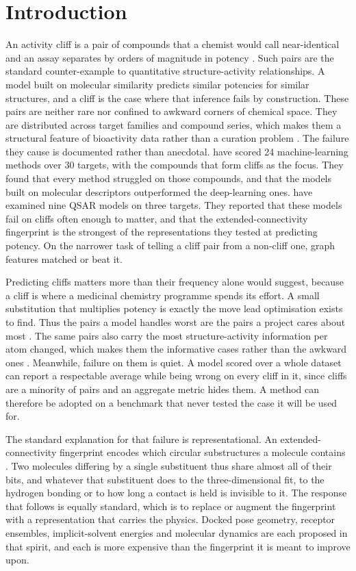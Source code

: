 \section{Introduction}

An activity cliff is a pair of compounds that a chemist would call near-identical and
an assay separates by orders of magnitude in potency \citep{maggiora2006}. Such pairs
are the standard counter-example to quantitative structure-activity relationships. A
model built on molecular similarity predicts similar potencies for similar structures,
and a cliff is the case where that inference fails by construction. These pairs are
neither rare nor confined to awkward corners of chemical space. They are distributed
across target families and compound series, which makes them a structural feature of
bioactivity data rather than a curation problem \citep{stumpfe2012}. The failure they
cause is documented rather than anecdotal. \citet{vantilborg2022} have scored 24
machine-learning methods over 30 targets, with the compounds that form cliffs as the
focus. They found that every method struggled on those compounds, and that the models
built on molecular descriptors outperformed the deep-learning ones.
\citet{dablander2023} have examined nine QSAR models on three targets. They reported
that these models fail on cliffs often enough to matter, and that the
extended-connectivity fingerprint is the strongest of the representations they tested
at predicting potency. On the narrower task of telling a cliff pair from a non-cliff
one, graph features matched or beat it.

Predicting cliffs matters more than their frequency alone would suggest, because a
cliff is where a medicinal chemistry programme spends its effort. A small substitution
that multiplies potency is exactly the move lead optimisation exists to find. Thus the
pairs a model handles worst are the pairs a project cares about most
\citep{stumpfe2019}. The same pairs also carry the most structure-activity information
per atom changed, which makes them the informative cases rather than the awkward ones
\citep{cruzmonteagudo2014}. Meanwhile, failure on them is quiet. A model scored over a
whole dataset can report a respectable average while being wrong on every cliff in it,
since cliffs are a minority of pairs and an aggregate metric hides them. A method can
therefore be adopted on a benchmark that never tested the case it will be used for.

The standard explanation for that failure is representational. An
extended-connectivity fingerprint encodes which circular substructures a molecule
contains \citep{rogers2010}. Two molecules differing by a single substituent thus share
almost all of their bits, and whatever that substituent does to the three-dimensional
fit, to the hydrogen bonding or to how long a contact is held is invisible to it. The
response that follows is equally standard, which is to replace or augment the
fingerprint with a representation that carries the physics. Docked pose geometry,
receptor ensembles, implicit-solvent energies and molecular dynamics are each proposed
in that spirit, and each is more expensive than the fingerprint it is meant to improve
upon.

